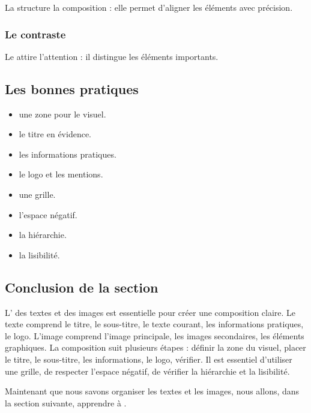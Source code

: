 La  structure la composition : elle permet d'aligner les éléments avec précision.

\subsubsection{Le contraste}

Le  attire l'attention : il distingue les éléments importants.

\subsection{Les bonnes pratiques}

\begin{itemize}
    \item {} une zone pour le visuel.
    \item {} le titre en évidence.
    \item {} les informations pratiques.
    \item {} le logo et les mentions.
    \item {} une grille.
    \item {} l'espace négatif.
    \item {} la hiérarchie.
    \item {} la lisibilité.
\end{itemize}

\subsection*{Conclusion de la section}

L' des textes et des images est essentielle pour créer une composition claire. Le texte comprend le titre, le sous-titre, le texte courant, les informations pratiques, le logo. L'image comprend l'image principale, les images secondaires, les éléments graphiques. La composition suit plusieurs étapes : définir la zone du visuel, placer le titre, le sous-titre, les informations, le logo, vérifier. Il est essentiel d'utiliser une grille, de respecter l'espace négatif, de vérifier la hiérarchie et la lisibilité.

Maintenant que nous savons organiser les textes et les images, nous allons, dans la section suivante, apprendre à .

